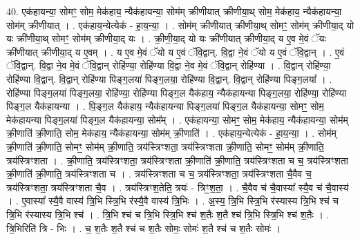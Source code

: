 \documentclass[17pt]{extarticle}
\begin{document}
40. एक॑हायन्या॒ सोमꣳ॒॒ सोम॒ मेक॑हाय॒ न्यैक॑हायन्या॒ सोम॑म् क्रीणीयात् क्रीणीया॒थ् सोम॒ मेक॑हाय॒
न्यैक॑हायन्या॒ सोम॑म् क्रीणीयात् । . एक॑हाय॒न्येत्येक॑ - हा॒य॒न्या॒ । . सोम॑म् क्रीणीयात् क्रीणीया॒थ् सोमꣳ॒॒ सोम॑म् क्रीणीया॒द् यो यः क्री॑णीया॒थ् सोमꣳ॒॒ सोम॑म् क्रीणीया॒द् यः । . क्री॒णी॒या॒द् यो यः क्री॑णीयात् क्रीणीया॒द् य ए॒व मे॒वं ॅयः क्री॑णीयात् क्रीणीया॒द् य ए॒वम् । . य ए॒व मे॒वं ॅयो य ए॒वं ॅवि॒द्वान्. वि॒द्वा ने॒वं ॅयो य ए॒वं ॅवि॒द्वान् । . ए॒वं ॅवि॒द्वान्. वि॒द्वा ने॒व मे॒वं ॅवि॒द्वान् रोहि॑ण्या॒ रोहि॑ण्या वि॒द्वा ने॒व मे॒वं ॅवि॒द्वान् रोहि॑ण्या । . वि॒द्वान् रोहि॑ण्या॒ रोहि॑ण्या वि॒द्वान्. वि॒द्वान् रोहि॑ण्या पिङ्ग॒लया॑ पिङ्ग॒लया॒ रोहि॑ण्या वि॒द्वान्. वि॒द्वान् रोहि॑ण्या पिङ्ग॒लया᳚ । . रोहि॑ण्या पिङ्ग॒लया॑ पिङ्ग॒लया॒ रोहि॑ण्या॒ रोहि॑ण्या पिङ्ग॒ल यैक॑हाय॒ न्यैक॑हायन्या पिङ्ग॒लया॒ रोहि॑ण्या॒ रोहि॑ण्या पिङ्ग॒ल यैक॑हायन्या । . पि॒ङ्ग॒ल यैक॑हाय॒ न्यैक॑हायन्या पिङ्ग॒लया॑ पिङ्ग॒ल यैक॑हायन्या॒ सोमꣳ॒॒ सोम॒ मेक॑हायन्या पिङ्ग॒लया॑ पिङ्ग॒ल यैक॑हायन्या॒ सोम᳚म् । . एक॑हायन्या॒ सोमꣳ॒॒ सोम॒ मेक॑हाय॒ न्यैक॑हायन्या॒ सोम॑म् क्री॒णाति॑ क्री॒णाति॒ सोम॒ मेक॑हाय॒
न्यैक॑हायन्या॒ सोम॑म् क्री॒णाति॑ । . एक॑हाय॒न्येत्येक॑ - हा॒य॒न्या॒ । . सोम॑म् क्री॒णाति॑ क्री॒णाति॒ सोमꣳ॒॒ सोम॑म् क्री॒णाति॒ त्रय॑स्त्रिꣳशता॒ त्रय॑स्त्रिꣳशता क्री॒णाति॒ सोमꣳ॒॒ सोम॑म् क्री॒णाति॒ त्रय॑स्त्रिꣳशता । . क्री॒णाति॒ त्रय॑स्त्रिꣳशता॒ त्रय॑स्त्रिꣳशता क्री॒णाति॑ क्री॒णाति॒ त्रय॑स्त्रिꣳशता च च॒ त्रय॑स्त्रिꣳशता क्री॒णाति॑ क्री॒णाति॒ त्रय॑स्त्रिꣳशता च । . त्रय॑स्त्रिꣳशता च च॒ त्रय॑स्त्रिꣳशता॒ त्रय॑स्त्रिꣳशता चै॒वैव च॒ त्रय॑स्त्रिꣳशता॒ त्रय॑स्त्रिꣳशता चै॒व । . त्रय॑स्त्रिꣳश॒तेति॒ त्रयः॑ - त्रिꣳ॒॒श॒ता॒ । . चै॒वैव च॑ चै॒वास्या᳚ स्यै॒व च॑ चै॒वास्य॑ । . ए॒वास्या᳚ स्यै॒वै वास्य॑ त्रि॒भि स्त्रि॒भि र॑स्यै॒वै वास्य॑ त्रि॒भिः । . अ॒स्य॒ त्रि॒भि स्त्रि॒भि र॑स्यास्य त्रि॒भि श्च॑ च त्रि॒भि र॑स्यास्य त्रि॒भि श्च॑ । . त्रि॒भि श्च॑ च त्रि॒भि स्त्रि॒भि श्च॑ श॒तैः श॒तै श्च॑ त्रि॒भि स्त्रि॒भि श्च॑ श॒तैः । . त्रि॒भिरिति॑ त्रि - भिः । . च॒ श॒तैः श॒तै श्च॑ च श॒तैः सोमः॒ सोमः॑ श॒तै श्च॑ च श॒तैः सोमः॑ । \newline
\pagebreak
{}
\end{document}
